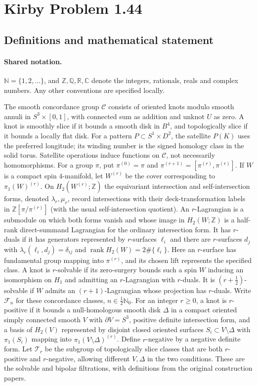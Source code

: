 \documentclass[11pt]{article}
\begin{document}
\section{Kirby Problem 1.44}\label{statement}

\subsection{Definitions and mathematical statement}

\paragraph{Shared notation.}$\mathbb N=\{1,2,\ldots\}$, and $\mathbb Z,\mathbb Q,\mathbb R,\mathbb C$ denote the integers, rationals, reals and complex numbers. Any other conventions are specified locally.


The smooth concordance group $\mathcal C$ consists of oriented knots modulo smooth annuli in $S^3\times[0,1]$, with connected sum as addition and unknot $U$ as zero. A knot is smoothly slice if it bounds a smooth disk in $B^4$, and topologically slice if it bounds a locally flat disk. For a pattern $P\subset S^1\times D^2$, the satellite $P(K)$ uses the preferred longitude; its winding number is the signed homology class in the solid torus. Satellite operations induce functions on $\mathcal C$, not necessarily homomorphisms. For a group $\pi$, put $\pi^{(0)}=\pi$ and $\pi^{(r+1)}=[\pi^{(r)},\pi^{(r)}]$. If $W$ is a compact spin $4$-manifold, let $W^{(r)}$ be the cover corresponding to $\pi_1(W)^{(r)}$. On $H_2(W^{(r)};\mathbb Z)$ the equivariant intersection and self-intersection forms, denoted $\lambda_r,\mu_r$, record intersections with their deck-transformation labels in $\mathbb Z[\pi/\pi^{(r)}]$ (with the usual self-intersection quotient). An $r$-Lagrangian is a submodule on which both forms vanish and whose image in $H_2(W;\mathbb Z)$ is a half-rank direct-summand Lagrangian for the ordinary intersection form. It has $r$-duals if it has generators represented by $r$-surfaces $\ell_i$ and there are $r$-surfaces $d_j$ with $\lambda_r(\ell_i,d_j)=\delta_{ij}$ and $\operatorname{rank}H_2(W)=2\#\{\ell_i\}$. Here an $r$-surface has fundamental group mapping into $\pi^{(r)}$, and its chosen lift represents the specified class. A knot is $r$-solvable if its zero-surgery bounds such a spin $W$ inducing an isomorphism on $H_1$ and admitting an $r$-Lagrangian with $r$-duals. It is $(r+\tfrac12)$-solvable if $W$ admits an $(r+1)$-Lagrangian whose projection has $r$-duals. Write $\mathcal F_n$ for these concordance classes, $n\in\tfrac12\mathbb N_0$. For an integer $r\geq0$, a knot is $r$-positive if it bounds a null-homologous smooth disk $\Delta$ in a compact oriented simply connected smooth $V$ with $\partial V=S^3$, positive definite intersection form, and a basis of $H_2(V)$ represented by disjoint closed oriented surfaces $S_i\subset V\setminus\Delta$ with $\pi_1(S_i)$ mapping into $\pi_1(V\setminus\Delta)^{(r)}$. Define $r$-negative by a negative definite form. Let $\mathcal T_r$ be the subgroup of topologically slice classes that are both $r$-positive and $r$-negative, allowing different $V,\Delta$ in the two conditions. These are the solvable and bipolar filtrations, with definitions from the original construction papers.
\end{document}
